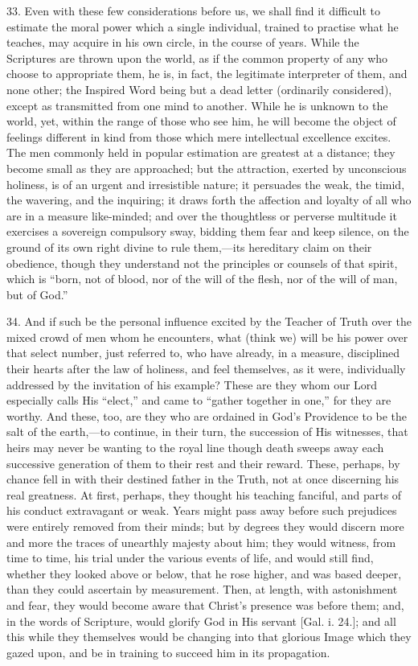 33. Even with these few considerations before us, we shall find it
difficult to estimate the moral power which a single individual,
trained to practise what he teaches, may acquire in his own circle, in
the course of years. While the Scriptures are thrown upon the world,
as if the common property of any who choose to appropriate them, he
is, in fact, the legitimate interpreter of them, and none other; the
Inspired Word being but a dead letter (ordinarily considered), except
as transmitted from one mind to another. While he is unknown to the
world, yet, within the range of those who see him, he will become the
object of feelings different in kind from those which mere
intellectual excellence excites. The men commonly held in popular
estimation are greatest at a distance; they become small as they are
approached; but the attraction, exerted by unconscious holiness, is of
an urgent and irresistible nature; it persuades the weak, the timid,
the wavering, and the inquiring; it draws forth the affection and
loyalty of all who are in a measure like-minded; and over the
thoughtless or perverse multitude it exercises a sovereign compulsory
sway, bidding them fear and keep silence, on the ground of its own
right divine to rule them,—its hereditary claim on their obedience,
though they understand not the principles or counsels of that spirit,
which is ``born, not of blood, nor of the will of the flesh, nor
of the will of man, but of God.''

34. And if such be the personal influence excited by the Teacher of
Truth over the mixed crowd of men whom he encounters, what (think we)
will be his power over that select number, just referred to, who have
already, in a measure, disciplined their hearts after the law of
holiness, and feel themselves, as it were, individually addressed by
the invitation of his example? These are they whom our Lord especially
calls His ``elect,'' and came to ``gather together in
one,'' for they are worthy. And these, too, are they who are
ordained in God's Providence to be the salt of the earth,—to
continue, in their turn, the succession of His witnesses, that heirs
may never be wanting to the royal line though death sweeps away each
successive generation of them to their rest and their reward. These,
perhaps, by chance fell in with their destined father in the Truth,
not at once discerning his real greatness. At first, perhaps, they
thought his teaching fanciful, and parts of his conduct extravagant or
weak. Years might pass away before such prejudices were entirely
removed from their minds; but by degrees they would discern more and
more the traces of unearthly majesty about him; they would witness,
from time to time, his trial under the various events of life, and
would still find, whether they looked above or below, that he rose
higher, and was based deeper, than they could ascertain by
measurement. Then, at length, with astonishment and fear, they would
become aware that Christ's presence was before them; and, in the words
of Scripture, would glorify God in His servant [Gal. i. 24.]; and all
this while they themselves would be changing into that glorious Image
which they gazed upon, and be in training to succeed him in its
propagation.

